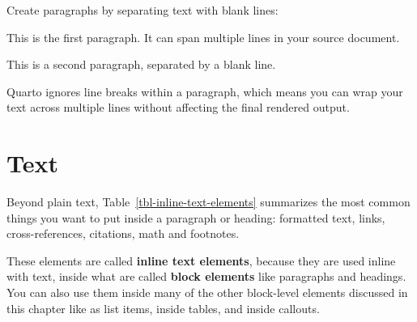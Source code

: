 \documentclass[
  letterpaper,
  DIV=11,
  numbers=noendperiod,
  oneside]{scrreprt}
\newenvironment{Shaded}{\begin{snugshade}}{\end{snugshade}}
\newcommand{\NormalTok}[1]{\textcolor[rgb]{0.00,0.23,0.31}{#1}}
\begin{document}
\begin{tcolorbox}
Create paragraphs by separating text with blank lines:

\begin{Shaded}
\begin{Highlighting}[]
\NormalTok{This is the first paragraph. It can span multiple lines }
\NormalTok{in your source document.}

\NormalTok{This is a second paragraph, separated by a blank line.}
\end{Highlighting}
\end{Shaded}

Quarto ignores line breaks within a paragraph, which means you can wrap
your text across multiple lines without affecting the final rendered
output.

\section{Text}\label{text}

Beyond plain text, Table~\ref{tbl-inline-text-elements} summarizes the
most common things you want to put inside a paragraph or heading:
formatted text, links, cross-references, citations, math and footnotes.

These elements are called \textbf{inline text elements}, because they
are used inline with text, inside what are called \textbf{block
elements} like paragraphs and headings. You can also use them inside
many of the other block-level elements discussed in this chapter like as
list items, inside tables, and inside callouts.


\end{tcolorbox}
\end{document}

